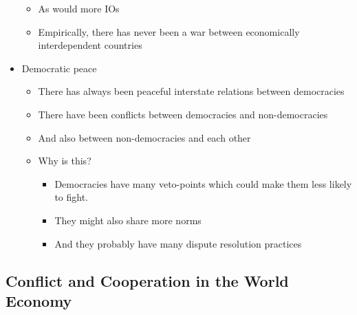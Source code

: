 \documentclass[11pt]{article}
\begin{document}
\begin{itemize}
\begin{itemize}
\item As would more IOs
\item Empirically, there has never been a war between economically interdependent countries
\end{itemize}
\item Democratic peace
\begin{itemize}
\item There has always been peaceful interstate relations between democracies
\item There have been conflicts between democracies and non-democracies
\item And also between non-democracies and each other
\item Why is this? 
\begin{itemize}
\item Democracies have many veto-points which could make them less likely to
fight.
\item They might also share more norms
\item And they probably have many dispute resolution practices
\end{itemize}
\end{itemize}
\end{itemize}
\subsection{Conflict and Cooperation in the World Economy}
\label{sec:org62da158}
\end{document}
